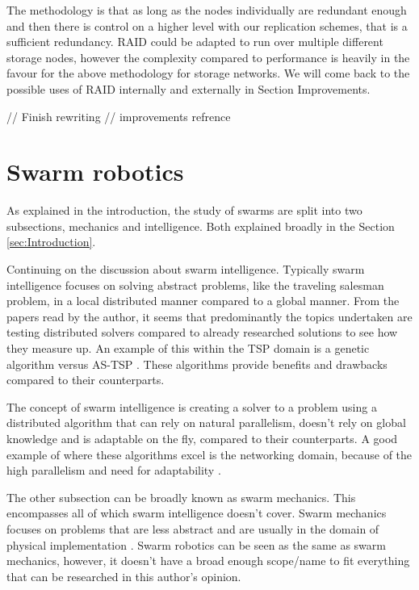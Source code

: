\documentclass{UoYCSproject}
\begin{document}
The methodology is that as long as the nodes individually are redundant enough and then there is control on a higher level with our replication schemes, that is a sufficient redundancy. 
RAID could be adapted to run over multiple different storage nodes, however the complexity compared to performance is heavily in the favour for the above methodology for storage networks. 
We will come back to the possible uses of RAID internally and externally in Section {Improvements}.

// Finish rewriting
// improvements refrence


\section{Swarm robotics}
\label{sec:Robotics}

As explained in the introduction, the study of swarms are split into two subsections, mechanics and intelligence. 
Both explained broadly in the Section \ref{sec:Introduction}. 

Continuing on the discussion about swarm intelligence. 
Typically swarm intelligence focuses on solving abstract problems, like the traveling salesman problem, in a local distributed manner compared to a global manner. 
From the papers read by the author, it seems that predominantly the topics undertaken are testing distributed solvers compared to already researched solutions to see how they measure up. 
An example of this within the TSP domain is a genetic algorithm versus AS-TSP \cite{Swarm intellegiegence}. 
These algorithms provide benefits and drawbacks compared to their counterparts.

The concept of swarm intelligence is creating a solver to a problem using a distributed algorithm that can rely on natural parallelism, doesn't rely on global knowledge and is adaptable on the fly, compared to their counterparts. 
A good example of where these algorithms excel is the networking domain, because of the high parallelism and need for adaptability \cite{Swarm intellegiegence}.

The other subsection can be broadly known as swarm mechanics. 
This encompasses all of which swarm intelligence doesn’t cover. 
Swarm mechanics focuses on problems that are less abstract and are usually in the domain of physical implementation \cite{Cognitive maps mine detection, Probabalitic automata foraging robots}. 
Swarm robotics can be seen as the same as swarm mechanics, however, it doesn’t have a broad enough scope/name to fit everything that can be researched in this author's opinion.
\end{document}
